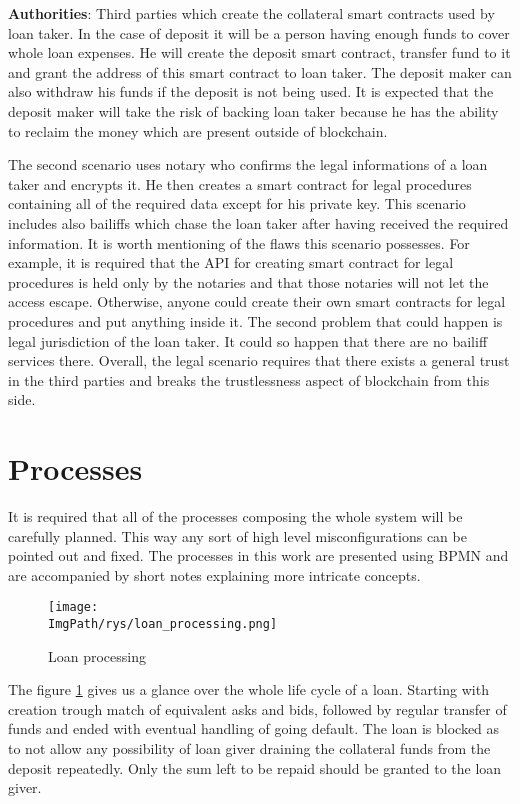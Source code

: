 \documentclass[a4paper,12pt,twoside,openany]{report}
\newcommand{\ImgPath}{.}
\begin{document}
\textbf{Authorities}: Third parties which create the collateral smart contracts used by loan taker. In the case of deposit it will be a person having enough funds to cover whole loan expenses. He will create the deposit smart contract, transfer fund to it and grant the address of this smart contract to loan taker. The deposit maker can also withdraw his funds if the deposit is not being used. It is expected that the deposit maker will take the risk of backing loan taker because he has the ability to reclaim the money which are present outside of blockchain.

The second scenario uses notary who confirms the legal informations of a loan taker and encrypts it. He then creates a smart contract for legal procedures containing all of the required data except for his private key. This scenario includes also bailiffs which chase the loan taker after having received the required information. It is worth mentioning of the flaws this scenario possesses. For example, it is required that the API for creating smart contract for legal procedures is held only by the notaries and that those notaries will not let the access escape. Otherwise, anyone could create their own smart contracts for legal procedures and put anything inside it. The second problem that could happen is legal jurisdiction of the loan taker. It could so happen that there are no bailiff services there. Overall, the legal scenario requires that there exists a general trust in the third parties and breaks the trustlessness aspect of blockchain from this side.


\section{Processes} \label{processes}

It is required that all of the processes composing the whole system will be carefully planned. This way any sort of high level misconfigurations can be pointed out and fixed. The processes in this work are presented using BPMN and are accompanied by short notes explaining more intricate concepts.

\begin{figure}[!htbp]
	\begin{center}
\centering
\texttt{[image: \\ImgPath/rys/loan\_processing.png]}
\end{center}
	\caption{Loan processing}
	\label{loan processing}
\end{figure}

The figure \ref{loan processing} gives us a glance over the whole life cycle of a loan. Starting with creation trough match of equivalent asks and bids, followed by regular transfer of funds and ended with eventual handling of going default. The loan is blocked as to not allow any possibility of loan giver draining the collateral funds from the deposit repeatedly. Only the sum left to be repaid should be granted to the loan giver.
\end{document}
